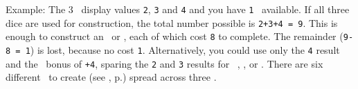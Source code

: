 Example: The 3 \whitedice\ display values \texttt{2}, \texttt{3} and \texttt{4} 
and you have \texttt{1} \greatperson\ available.  If all three dice are used for
construction, the total number possible is \texttt{2+3+4 = 9}.  This is enough 
to construct an \academy\ or \factory, each of which cost \texttt{8} to 
complete.  The remainder (\texttt{9-8 = 1}) is lost, because no \armaments cost 
\texttt{1}. Alternatively, you could use only the \texttt{4} result and the 
\greatperson\ bonus of \texttt{+4}, sparing the \texttt{2} and \texttt{3} 
results for \activating\ \armaments, \trade, or \culture.
\newline\newline
There are six different \armaments\ to create (see , 
p.\pageref{sec:armaments}) spread across three \levels.

